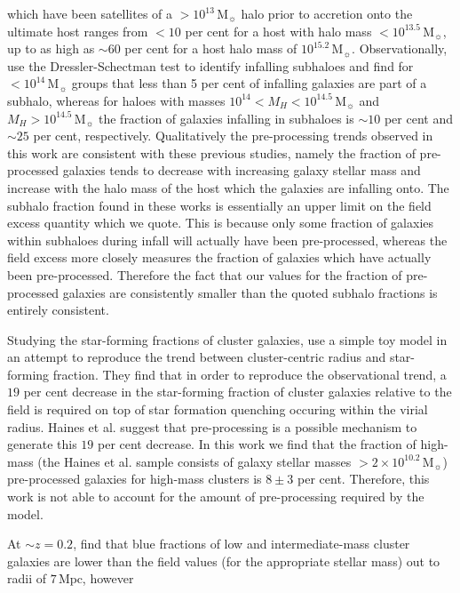 \documentclass[a4paper,fleqn,usenatbib]{mnras}
\newcommand{\Msun}{\,\mathrm{M_{\sun}}}
\begin{document}
which have been satellites of a $>\!10^{13}\Msun$ halo prior to accretion
onto the ultimate host ranges from $<10$ per cent for a host with halo
mass $<\!10^{13.5}\Msun$, up to as high as $\sim\!60$ per cent for a
host halo mass of $10^{15.2}\Msun$.
Observationally, \citet{hou2014} use the
Dressler-Schectman test \citep{dressler1988} to identify infalling
subhaloes and find for $<\!10^{14}\Msun$ groups that less than 5 per
cent of infalling galaxies are part of a subhalo, whereas for haloes
with masses $10^{14} < M_H < 10^{14.5}\Msun$ and $M_H >
10^{14.5}\Msun$ the fraction of galaxies infalling in subhaloes is
$\sim 10$ per cent and $\sim 25$ per cent, respectively.
Qualitatively the pre-processing trends observed in this work are
consistent with these previous studies, namely the fraction of
pre-processed galaxies tends to decrease with increasing galaxy stellar mass and
increase with the halo mass of the host which the galaxies are
infalling onto.  The subhalo fraction found in these works is
essentially an upper limit on the field excess quantity which we
quote.  This is because only some fraction of galaxies within subhaloes
during infall will actually have been pre-processed, whereas the
field excess more closely measures the fraction of galaxies
which have actually been pre-processed.  Therefore the fact that our
values for the fraction of pre-processed galaxies are consistently
smaller than the quoted subhalo fractions is entirely consistent.
\par
Studying the star-forming fractions of cluster galaxies,
\citet{haines2015} use a simple toy model in an attempt to reproduce the
trend between cluster-centric radius and star-forming fraction.  They
find that in order to reproduce the observational trend, a $19$ per
cent decrease in the star-forming fraction of cluster galaxies relative to
the field is required on top of star
formation quenching occuring within the virial radius.  Haines et
al. suggest that pre-processing is a possible mechanism to generate
this $19$ per cent decrease.  In this work we find that the fraction of
high-mass (the Haines et al. sample consists of galaxy stellar masses
$>\!2 \times 10^{10.2}\Msun$) pre-processed galaxies for high-mass
clusters is $8 \pm 3$ per cent.  Therefore, this work is not able to
account for the amount of pre-processing required by the
\citet{haines2015} model.
\par
At $\sim\!z=0.2$, \citet{lu2012} find that blue fractions of low and
intermediate-mass cluster galaxies are lower than the field values
(for the appropriate stellar mass) out to radii of $7\,\mathrm{Mpc}$, however
\end{document}
